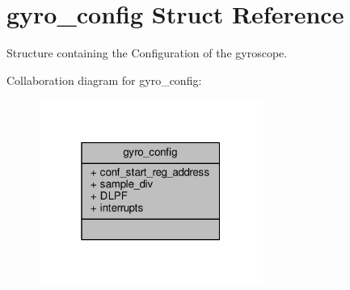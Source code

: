 \hypertarget{structgyro__config}{\section{gyro\+\_\+config Struct Reference}
\label{structgyro__config}
}


Structure containing the Configuration of the gyroscope.  




Collaboration diagram for gyro\+\_\+config\+:
\nopagebreak
\begin{figure}[H]
\begin{center}
\leavevmode
\includegraphics[width=208pt]{structgyro__config__coll__graph}
\end{center}
\end{figure}
